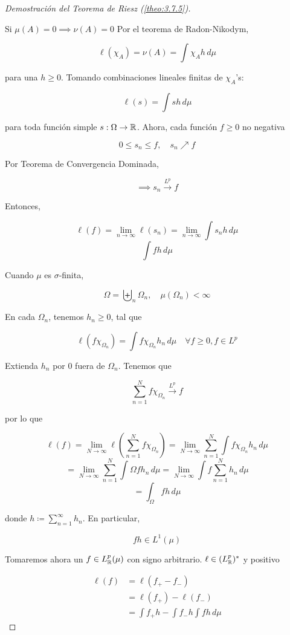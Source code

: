 \begin{proof}[Demostración del Teorema de Riesz (\ref{theo:3.7.5})]
\begin{enumerate}[label=(\alph*)]
        Si $\mu(A)=0\implies \nu(A)=0$ Por el teorema de Radon-Nikodym, 

        \[\ell(\chi_A)=\nu(A)=\int \chi_A h\,d\mu\]

        para una $h\geq 0$. Tomando combinaciones lineales finitas de $\chi_A$'s:

        \[\ell(s)=\int sh\,d\mu\]

        para toda función simple $s:\Omega\to\mathbb{R}$. Ahora, cada función $f\geq 0$ no negativa 

        \[0\leq s_n\leq f,\quad s_n\nearrow f\]

        Por Teorema de Convergencia Dominada,

        \[\implies s_n\xrightarrow{L^p}f\]

        Entonces, 

        \[\ell(f)=\lim_{n\to\infty}\ell(s_n)=\lim_{n\to\infty} \int s_nh\,d\mu\]
        \[\int fh\,d\mu\]

    \end{enumerate}

        Cuando $\mu$ es $\sigma$-finita,
        
        \[\Omega=\biguplus_n \Omega_n,\quad \mu(\Omega_n)<\infty\]

        En cada $\Omega_n$, tenemos $h_n\geq 0$, tal que 

        \[\ell(f\chi_{\Omega_n})=\int f\chi_{\Omega_n} h_n\,d\mu\quad \forall f\geq 0,f\in L^p\]

        Extienda $h_n$ por 0 fuera de $\Omega_n$. Tenemos que

        \[\sum_{n=1}^N f\chi_{\Omega_n}\xrightarrow{L^p}f\]

        por lo que 

        \[\ell(f)=\lim_{N\to\infty}\ell(\sum_{n=1}^N f\chi_{\Omega_n})=\lim_{N\to\infty} \sum_{n=1}^N \int f\chi_{\Omega_n}h_n\,d\mu\]
        \[=\lim_{N\to\infty} \sum_{n=1}^N \int \Omega fh_n\,d\mu=\lim_{N\to\infty}\int f\sum_{n=1}^N h_n\,d\mu\]
        \[=\int_{\Omega} fh\,d\mu\]
        
        donde $h\coloneqq \displaystyle\sum_{n=1}^\infty h_n$. En particular, 

        \[fh\in L^1(\mu)\]

        Tomaremos ahora un $f\in L^p_{\mathbb{R}}(\mu)$ con signo arbitrario. $\ell\in (L_{\mathbb{R}}^p)^*$ y positivo

        \begin{align*}
            \ell(f)&=\ell(f_+-f_-)\\
            &=\ell(f_+)-\ell(f_-)\\
            &=\int f_+h-\int f_-h\int fh\,d\mu
        \end{align*}


\end{proof}
